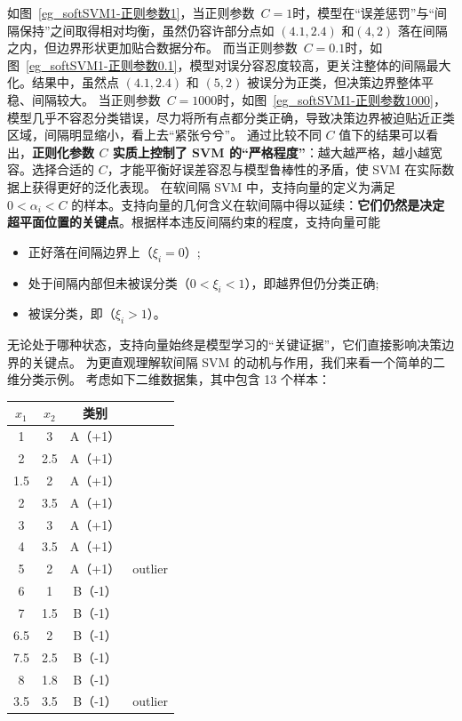 如图~\ref{eg_softSVM1-正则参数1}，当正则参数~$C=1$时，模型在“误差惩罚”与“间隔保持”之间取得相对均衡，虽然仍容许部分点如 $(4.1, 2.4)$ 和$(4, 2)$ 落在间隔之内，但边界形状更加贴合数据分布。
而当正则参数~$C=0.1$时，如图~\ref{eg_softSVM1-正则参数0.1}，模型对误分容忍度较高，更关注整体的间隔最大化。结果中，虽然点 $(4.1, 2.4)$ 和 $(5, 2)$ 被误分为正类，但决策边界整体平稳、间隔较大。
当正则参数~$C=1000$时，如图~\ref{eg_softSVM1-正则参数1000}，模型几乎不容忍分类错误，尽力将所有点都分类正确，导致决策边界被迫贴近正类区域，间隔明显缩小，看上去“紧张兮兮”。
通过比较不同 $C$ 值下的结果可以看出，\textbf{正则化参数 $C$ 实质上控制了 SVM 的“严格程度”}：越大越严格，越小越宽容。选择合适的 $C$，才能平衡好误差容忍与模型鲁棒性的矛盾，使 SVM 在实际数据上获得更好的泛化表现。
在软间隔 SVM 中，支持向量的定义为满足 $0 < \alpha_i < C$ 的样本。支持向量的几何含义在软间隔中得以延续：\textbf{它们仍然是决定超平面位置的关键点}。根据样本违反间隔约束的程度，支持向量可能
\begin{itemize}
\item 正好落在间隔边界上（$\xi_i = 0$）;
\item 处于间隔内部但未被误分类（$0 < \xi_i < 1$），即越界但仍分类正确;
\item 被误分类，即（$\xi_i > 1$）。
\end{itemize}
无论处于哪种状态，支持向量始终是模型学习的“关键证据”，它们直接影响决策边界的关键点。
为更直观理解软间隔 SVM 的动机与作用，我们来看一个简单的二维分类示例。
考虑如下二维数据集，其中包含 13 个样本：
\begin{center}
\begin{tabular}{cccc}
\toprule
$x_1$ & $x_2$ & 类别  & \\
\midrule
1 & 3 & A（+1） & \\
2 & 2.5 & A（+1）&  \\
1.5 &2 & A（+1）  &\\
2 & 3.5 & A（+1） & \\
3 & 3 &  A（+1）  &\\
4 &3.5 & A（+1）&\\
5 & 2 &  A（+1）& outlier \\
\midrule
6 & 1 &  B（-1）&\\
7 & 1.5 &  B（-1）&\\
6.5 & 2 &  B（-1）&\\
7.5 & 2.5 &  B（-1）&\\
8 & 1.8 &  B（-1）&\\
3.5 & 3.5 &  B（-1）& outlier\\
\bottomrule
\end{tabular}
\end{center}
